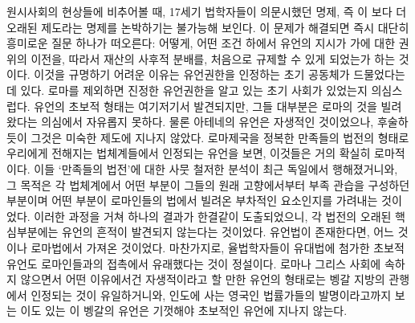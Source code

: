 원시사회의 현상들에 비추어볼 때,
17세기 법학자들이 의문시했던 명제, 즉
이 보다 더 오래된 제도라는 명제를
논박하기는 불가능해 보인다.
이 문제가 해결되면 즉시 대단히 흥미로운 질문 하나가 떠오른다:
어떻게, 어떤 조건 하에서
유언의 지시가
가에 대한 권위의 이전을,
따라서 재산의 사후적 분배를,
처음으로 규제할 수 있게 되었는가 하는 것이다.
이것을 규명하기 어려운 이유는
유언권한을 인정하는 초기 공동체가 드물었다는 데 있다.
로마를 제외하면 진정한 유언권한을 알고 있는 초기 사회가 있었는지 의심스럽다.
유언의 초보적 형태는 여기저기서 발견되지만,
그들 대부분은 로마의 것을 빌려왔다는 의심에서 자유롭지 못하다.
물론 아테네의 유언은 자생적인 것이었으나,
후술하듯이 그것은 미숙한 제도에 지나지 않았다.
로마제국을 정복한 만족들의 법전의 형태로 우리에게 전해지는
법체계들에서 인정되는 유언을 보면, 이것들은 거의 확실히 로마적이다.
%
이들 `만족들의 법전'에 대한
사뭇 철저한 분석이 최근 독일에서 행해졌거니와,
그 목적은 각 법체계에서 어떤 부분이
그들의 원래 고향에서부터 부족 관습을 구성하던 부분이며
어떤 부분이 로마인들의 법에서 빌려온 부차적인 요소인지를
가려내는 것이었다.
이러한 과정을 거쳐 하나의 결과가 한결같이 도출되었으니,
각 법전의 오래된 핵심부분에는 유언의 흔적이 발견되지 않는다는 것이었다.
유언법이 존재한다면, 어느 것이나 로마법에서 가져온 것이었다.
마찬가지로,  율법학자들이 유대법에 첨가한
초보적 유언도 로마인들과의 접촉에서 유래했다는 것이 정설이다.
로마나 그리스 사회에 속하지 않으면서
어떤 이유에서건 자생적이라고 할 만한 유언의 형태로는
벵갈 지방의 관행에서 인정되는 것이 유일하거니와,
인도에 사는 영국인 법률가들의 발명이라고까지 보는 이도 있는
이 벵갈의 유언은
기껏해야 초보적인 유언에 지나지 않는다.

